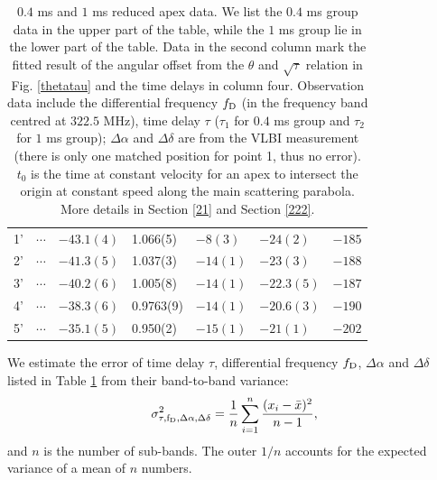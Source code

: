 \documentclass[useAMS,usenatbib]{mn2e}
\begin{document}
\begin{table}
\begin{tabular}{c|llllll}
1'&$ \cdots$ & $-43.1(4)$      & 1.066(5)    & $-8(3)$     & $-24(2)$   & $-185$   \\
2'&$\cdots$ & $-41.3(5)$    & 1.037(3)   & $-14(1)$     & $-23(3)$   & $-188$                                   \\
3'&$\cdots$ & $-40.2(6)$  & 1.005(8)    & $-14(1)$       & $-22.3(5)$  & $-187$                                   \\
4'&$\cdots$ & $-38.3(6)$  & 0.9763(9)   & $-14(1)$       & $-20.6(3)$  & $-190$                                    \\
5'&$\cdots$& $-35.1(5)$  & 0.950(2)   & $-15(1)$  & $-21(1)$   &$-202$                                   \\
 \hline                                 
\end{tabular}
\caption{ $0.4$ ms and $1$ ms reduced apex data. 
We list the $0.4$ ms group data in the upper part of the table, while the $1$ ms group lie in the lower part of the table.  
Data in the second column mark the fitted result of the angular offset from the $\theta$ and $\sqrt{\tau}$ relation in Fig. \ref{thetatau} and the time delays in column four.
Observation data include the differential frequency $f_{\rm D}$ (in the frequency band centred at $322.5$ MHz), time delay
$\tau$ ($\tau_1$ for $0.4$ ms group and $\tau_2$ for $1$ ms group);
$\Delta\alpha$ and $\Delta\delta$ are from the VLBI measurement (there is only one matched position for point 1, thus no error). 
$t_0$ is the time at constant velocity for an apex to intersect the
origin at constant speed along the main scattering parabola.  More
details in Section \ref{21} and Section \ref{222}.
}
\label{table:apex}
\end{table}
We estimate the error of time delay $\tau$, differential frequency
$f_{\rm D}$, $\Delta\alpha$ and $\Delta\delta$  listed in Table
\ref{table:apex} from their band-to-band variance:
\begin{equation}
\sigma^2_{\rm \tau, f_{\rm D},\Delta\alpha, \Delta\delta} = \frac{1}{n}\sum^{n}_{i=1}\frac{(x_i-\bar{x})^2}{n-1},
\end{equation}
and $n$ is the number of sub-bands. The outer $1/n$ accounts for the expected variance of a mean of $n$ numbers.
\end{document}
